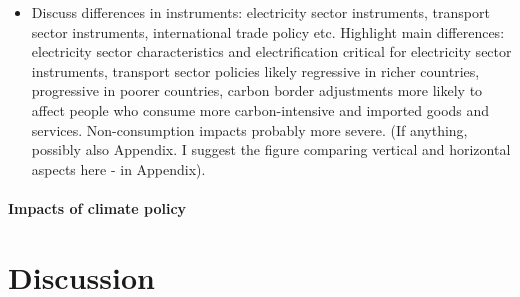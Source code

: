\documentclass[12pt, a4paper]{article}
\begin{document}
\begin{itemize}
  \item Discuss differences in instruments: electricity sector instruments, transport sector instruments, international trade policy etc. Highlight main differences: electricity sector characteristics and electrification critical for electricity sector instruments, transport sector policies likely regressive in richer countries, progressive in poorer countries, carbon border adjustments more likely to affect people who consume more carbon-intensive and imported goods and services. Non-consumption impacts probably more severe. (If anything, possibly also Appendix. I suggest the figure comparing vertical and horizontal aspects here - in Appendix).
\end{itemize}

\paragraph{Impacts of climate policy}

\section{Discussion} \label{sec:discussion}
\end{document}
